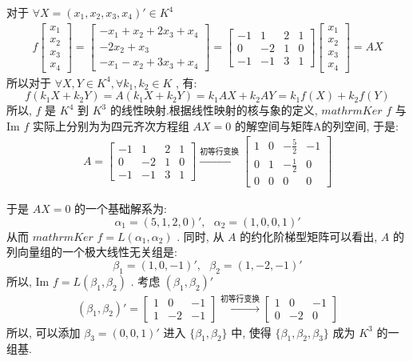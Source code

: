 \documentclass[11pt,a4paper,openany,oneside]{book}
\begin{document}
对于 $ \forall X = (x_1, x_2, x_3, x_4)' \in K^4 $ 
\begin{gather*}
f
\begin{bmatrix}
x_1 \\ x_2 \\ x_3 \\ x_4
\end{bmatrix}
=
\begin{bmatrix}
-x_1 + x_2 + 2x_3 + x_4 \\ 
-2x_2 + x_3 \\
-x_1 -x_2 + 3x_3 + x_4
\end{bmatrix}
=
\begin{bmatrix}
-1 & 1 & 2 & 1 \\
0  & -2 & 1 & 0 \\
-1 & -1 & 3 & 1 
\end{bmatrix}
\begin{bmatrix}
x_1 \\ x_2 \\ x_3 \\ x_4
\end{bmatrix}
=AX
\end{gather*}
所以对于 $ \forall X, Y \in K^4, \forall k_1,k_2 \in K $ , 有:
 $$  f(k_1X + k_2Y) = A(k_1X + k_2Y) = k_1AX + k_2AY = k_1f(X)+k_2f(Y)   $$ 
所以,  $ f $ 是 $ K^4 $ 到 $ K^3 $ 的线性映射.根据线性映射的核与象的定义,  $mathrm{Ker}$  $ f $ 与Im $ f $ 实际上分别为为四元齐次方程组 $ AX=0 $ 的解空间与矩阵A的列空间, 于是:
\begin{gather*}
A=
\begin{bmatrix}
-1 & 1 & 2 & 1 \\
0  & -2 & 1 & 0 \\
-1 & -1 & 3 & 1 
\end{bmatrix}
\xrightarrow{\text{初等行变换}}
\begin{bmatrix}
1 & 0 & -\frac{5}{2} & -1  \\
0 & 1 & -\frac{1}{2} &  0  \\
0 & 0 &         0      &  0
\end{bmatrix}
\end{gather*}

于是 $ AX=0 $ 的一个基础解系为:
 $$  \alpha_1 = ( 5,1 ,2,0)', \ \ \ \alpha_2 = (1, 0, 0, 1)'  $$ 
从而 $mathrm{Ker}$  $ f = L(\alpha_1, \alpha_2) $ . 同时, 从 $ A $ 的约化阶梯型矩阵可以看出,  $ A $ 的列向量组的一个极大线性无关组是:
 $$  \beta_1 = (1, 0, -1)', \ \ \ \beta_2=(1, -2, -1)'  $$  
所以, Im $ f = L(\beta_1, \beta_2) $ . 考虑 $ (\beta_1, \beta_2)' $ 
\begin{gather*}
(\beta_1, \beta_2)'=
\begin{bmatrix}
1  &  0  &  -1  \\
1  &  -2  &  -1
\end{bmatrix}
\xrightarrow{初等行变换}
\begin{bmatrix}
1  &  0  &  -1  \\
0  &  -2 &  0  
\end{bmatrix}
\end{gather*}
所以, 可以添加 $ \beta_3=(0, 0, 1)' $ 进入 $ \{\beta_1, \beta_2\} $ 中, 使得 $ \{\beta_1, \beta_2, \beta_3 \} $ 成为 $ K^3 $ 的一组基.
\end{document}
